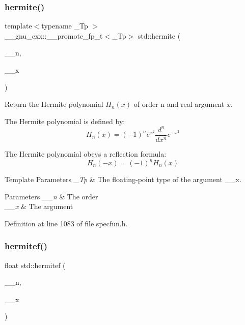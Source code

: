 \subsubsection{\texorpdfstring{hermite()}{hermite()}}
{\footnotesize\ttfamily template$<$typename \+\_\+\+Tp $>$ \\
\+\_\+\+\_\+gnu\+\_\+cxx\+::\+\_\+\+\_\+promote\+\_\+fp\+\_\+t$<$\+\_\+\+Tp$>$ std\+::hermite (\begin{DoxyParamCaption}\item[{unsigned int}]{\+\_\+\+\_\+n,  }\item[{\+\_\+\+Tp}]{\+\_\+\+\_\+x }\end{DoxyParamCaption})\hspace{0.3cm}{\ttfamily [inline]}}

Return the Hermite polynomial $ H_n(x) $ of order n and {\ttfamily real} argument $ x $.

The Hermite polynomial is defined by\+: \[ H_n(x) = (-1)^n e^{x^2} \frac{d^n}{dx^n} e^{-x^2} \]

The Hermite polynomial obeys a reflection formula\+: \[ H_n(-x) = (-1)^n H_n(x) \]


\begin{DoxyTemplParams}{Template Parameters}
{\em \+\_\+\+Tp} & The floating-\/point type of the argument {\ttfamily \+\_\+\+\_\+x}. \\
\hline
\end{DoxyTemplParams}

\begin{DoxyParams}{Parameters}
{\em \+\_\+\+\_\+n} & The order \\
\hline
{\em \+\_\+\+\_\+x} & The argument \\
\hline
\end{DoxyParams}


Definition at line 1083 of file specfun.\+h.

\mbox{\label{group__tr29124__math__spec__func_ga94dae7444bb349e33057a92932db8abe}} 
\subsubsection{\texorpdfstring{hermitef()}{hermitef()}}
{\footnotesize\ttfamily float std\+::hermitef (\begin{DoxyParamCaption}\item[{unsigned int}]{\+\_\+\+\_\+n,  }\item[{float}]{\+\_\+\+\_\+x }\end{DoxyParamCaption})\hspace{0.3cm}{\ttfamily [inline]}}

